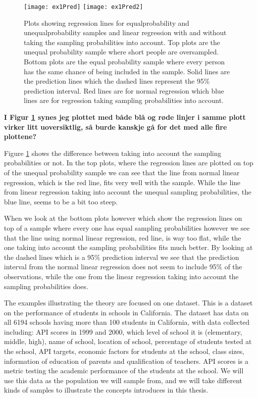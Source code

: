 \documentclass{article}
\begin{document}
\begin{example}
\begin{figure}
  \texttt{[image: ex1Pred]}
  \texttt{[image: ex1Pred2]}
  \caption{Plots showing regression lines for equalprobability and
    unequalprobability samples and linear regression with and without taking the
    sampling probabilities into account. Top plots are the unequal probability
    sample where short people are oversampled. Bottom plots are the equal
    probability sample where every person has the same chance of being included
    in the sample. Solid lines are the prediction lines which the dashed lines
    represent the
    95\% prediction interval. Red lines are for normal regression which blue
       lines are for regression taking sampling probabilities into account.}
  \label{fig:ex1Pred}
\end{figure}

\textbf{I Figur \ref{fig:ex1Pred} synes jeg plottet med både blå og røde linjer i samme plott virker litt
  uoversiktlig, så burde kanskje gå for det med alle fire plottene?}

Figure \ref{fig:ex1Pred} shows the difference between taking into account the
sampling probabilities or not.
In the top plots, where the regression lines are plotted on top of the unequal
probability sample we can see that the line from normal linear regression, which
is the red line, fits very well with the sample. While the line from linear
regression taking into account the unequal sampling probabilities, the blue line, seems to be a
bit too steep.

When we look at the bottom plots however which show the regression lines on top
of a sample where every one has equal sampling probabilities however we see that
the line using normal linear regression, red line, is way too flat, while the
one taking into account the sampling probabilities fits much better.
By looking at the dashed lines which is a 95\% prediction interval we see that
the prediction interval from the normal linear regression does not seem to
include 95\% of the observations, while the one from the linear regression
taking into account the sampling probabilities does.
\end{example}

The examples illustrating the theory are focused on one dataset. This is a dataset on the performance of students in schools in
California. The dataset has data on all 6194 schools having more than 100
students in California, with data collected
including: API scores in 1999 and 2000, which level of school it is
(elementary, middle, high), name of school, location of school, percentage of
students tested at the school, API targets, economic factors for students at the
school, class sizes, information of education of parents and qualification of teachers.
API scores is a metric testing the academic performance of the students at the school.
We will use this data as the population we will sample from, and we will take
different kinds of samples to illustrate the concepts introduces in this thesis.
\end{document}
